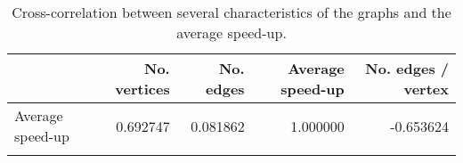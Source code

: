 \begin{table}[h]
\centering
 \caption{Cross-correlation between several characteristics of the graphs and the average speed-up.}
\begin{tabular}{lrrrr}
\toprule
{} &  No. vertices &   No. edges &      Average speed-up &  No. edges / vertex \\
\midrule
Average speed-up             &    0.692747 &  0.081862 &  1.000000 &         -0.653624 \\
\bottomrule
\label{tab:mst corr}
\end{tabular}
\end{table}